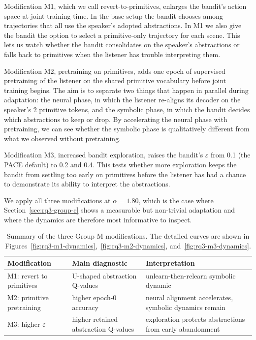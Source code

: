 Modification M1, which we call revert-to-primitives, enlarges the bandit's action space at joint-training time. In the base setup the bandit chooses among trajectories that all use the speaker's adopted abstractions. In M1 we also give the bandit the option to select a primitive-only trajectory for each scene. This lets us watch whether the bandit consolidates on the speaker's abstractions or falls back to primitives when the listener has trouble interpreting them.

Modification M2, pretraining on primitives, adds one epoch of supervised pretraining of the listener on the shared primitive vocabulary before joint training begins. The aim is to separate two things that happen in parallel during adaptation: the neural phase, in which the listener re-aligns its decoder on the speaker's 2 primitive tokens, and the symbolic phase, in which the bandit decides which abstractions to keep or drop. By accelerating the neural phase with pretraining, we can see whether the symbolic phase is qualitatively different from what we observed without pretraining.

Modification M3, increased bandit exploration, raises the bandit's $\varepsilon$ from 0.1 (the PACE default) to 0.2 and 0.4. This tests whether more exploration keeps the bandit from settling too early on primitives before the listener has had a chance to demonstrate its ability to interpret the abstractions.

We apply all three modifications at $\alpha = 1.80$, which is the case where Section~\ref{sec:rq3-group-c} shows a measurable but non-trivial adaptation and where the dynamics are therefore most informative to inspect.


\begin{table}[htbp]
\centering
\small
\setlength{\tabcolsep}{4pt}
\begin{tabularx}{\textwidth}{>{\raggedright\arraybackslash}p{}>{\raggedright\arraybackslash}X>{\raggedright\arraybackslash}X}
\toprule
Modification & Main diagnostic & Interpretation \\
\midrule
M1: revert to primitives & U-shaped abstraction Q-values & unlearn-then-relearn symbolic dynamic \\
M2: primitive pretraining & higher epoch-0 accuracy & neural alignment accelerates, symbolic dynamics remain \\
M3: higher $\varepsilon$ & higher retained abstraction Q-values & exploration protects abstractions from early abandonment \\
\bottomrule
\end{tabularx}
\caption{Summary of the three Group M modifications. The detailed curves are shown in Figures~\ref{fig:rq3-m1-dynamics},~\ref{fig:rq3-m2-dynamics}, and~\ref{fig:rq3-m3-dynamics}.}
\label{tab:rq3-m-summary}
\end{table}

